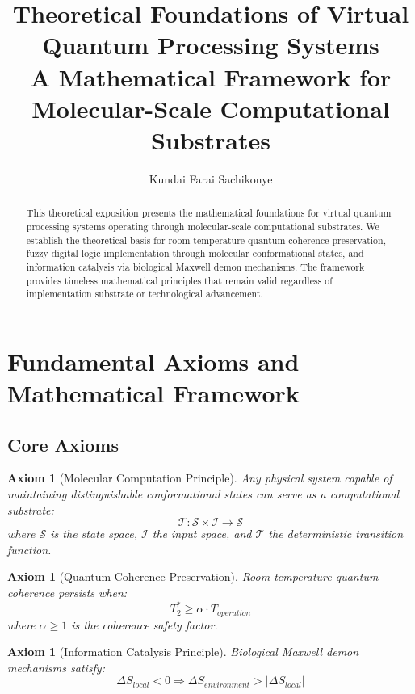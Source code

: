 \documentclass[12pt]{article}
\title{
    \Large\textbf{Theoretical Foundations of Virtual Quantum Processing Systems}\\
    \vspace{0.3cm}
    \normalsize A Mathematical Framework for Molecular-Scale Computational Substrates
}
\author{Kundai Farai Sachikonye}
\date{}
\newtheorem{axiom}[theorem]{Axiom}
\begin{document}
\maketitle

\begin{abstract}
This theoretical exposition presents the mathematical foundations for virtual quantum processing systems operating through molecular-scale computational substrates. We establish the theoretical basis for room-temperature quantum coherence preservation, fuzzy digital logic implementation through molecular conformational states, and information catalysis via biological Maxwell demon mechanisms. The framework provides timeless mathematical principles that remain valid regardless of implementation substrate or technological advancement.
\end{abstract}

\section{Fundamental Axioms and Mathematical Framework}

\subsection{Core Axioms}

\begin{axiom}[Molecular Computation Principle]
Any physical system capable of maintaining distinguishable conformational states can serve as a computational substrate:
\begin{equation}
\mathcal{T}: \mathcal{S} \times \mathcal{I} \rightarrow \mathcal{S}
\end{equation}
where $\mathcal{S}$ is the state space, $\mathcal{I}$ the input space, and $\mathcal{T}$ the deterministic transition function.
\end{axiom}

\begin{axiom}[Quantum Coherence Preservation]
Room-temperature quantum coherence persists when:
\begin{equation}
T_{2}^* \geq \alpha \cdot T_{operation}
\end{equation}
where $\alpha \geq 1$ is the coherence safety factor.
\end{axiom}

\begin{axiom}[Information Catalysis Principle]
Biological Maxwell demon mechanisms satisfy:
\begin{equation}
\Delta S_{local} < 0 \Rightarrow \Delta S_{environment} > |\Delta S_{local}|
\end{equation}
\end{axiom}
\end{document}
